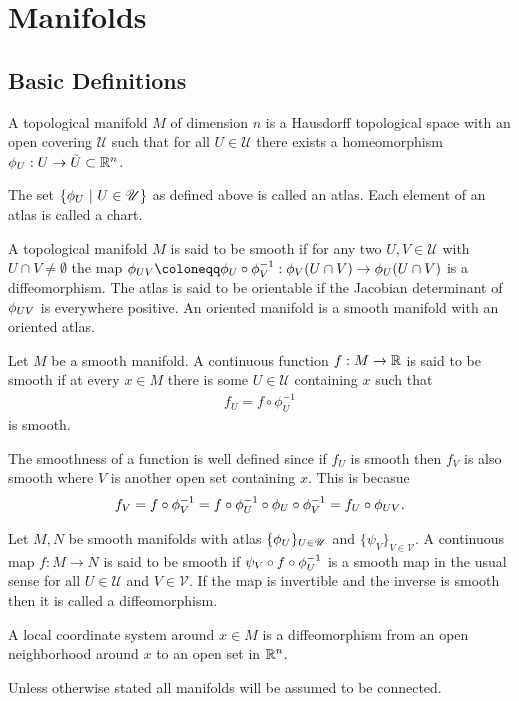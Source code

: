 \section{Manifolds}
\subsection{Basic Definitions}
\begin{definition}
  A topological manifold $M$ of dimension $n$ is a Hausdorff topological space with an open covering $ \mathscr{U}$ such that for all $U\in \mathscr{U}$ there exists a homeomorphism $\phi_U: U \to \tilde{U} \subset \mathbb{R}^n$.
\end{definition}
\begin{definition}
  The set $\{\phi_U\ |\ U\in \mathscr{U}\}$ as defined above is called an atlas. Each element of an atlas is called a chart.
\end{definition}
\begin{definition}
  A topological manifold $M$ is said to be smooth if for any two $U,V\in \mathscr{U}$ with $U\cap V \neq \emptyset$ the map $\p_{UV} \coloneqq \p_U\circ \p_V^{-1}: \p_V(U\cap V) \to \p_U(U\cap V)$ is a diffeomorphism. The atlas is said to be orientable if the Jacobian determinant of $\phi_{UV}$ is everywhere positive. An oriented manifold is a smooth manifold with an oriented atlas.
\end{definition}
\begin{definition}
  Let $M$ be a smooth manifold. A continuous function $f:M\to \mathbb{R}$ is said to be smooth if at every $x\in M$ there is some $U\in \mathscr{U}$ containing $x$ such that
  \begin{align*}
    f_U = f\circ \phi_U^{-1}
  \end{align*}
  is smooth.
\end{definition}
\begin{remark}
  The smoothness of a function is well defined since if $f_U$ is smooth then $f_V$ is also smooth where $V$ is another open set containing $x$. This is becasue
  \begin{align*}
    f_V = f\circ \phi_V^{-1} = f\circ \phi_U^{-1} \circ \phi_U \circ \phi_V^{-1} = f_U \circ \phi_{UV}.
  \end{align*}
\end{remark}
\begin{definition}
  Let $M,N$ be smooth manifolds with atlas $\{\phi_U\}_{U\in \mathscr{U}}$ and $\{\psi_V\}_{V\in \mathscr{V}}$. A continuous map $f:M\to N$ is said to be smooth if $\psi_V \circ f\circ \phi_U^{-1}$ is a smooth map in the usual sense for all $U\in \mathscr{U}$ and $V\in \mathscr{V}$. If the map is invertible and the inverse is smooth then it is called a diffeomorphism.
\end{definition}
\begin{definition}
  A local coordinate system around $x\in M$ is a diffeomorphism from an open neighborhood around $x$ to an open set in $\mathbb{R}^n$.
\end{definition}
Unless otherwise stated all manifolds will be assumed to be connected.

